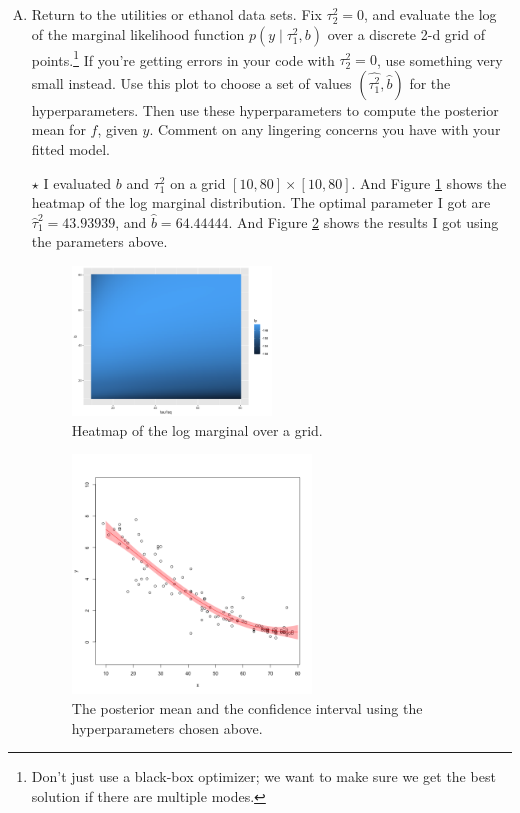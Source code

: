 \documentclass[11pt]{article}
\newcommand{\jie}{$\star$ }
\begin{document}
\begin{enumerate}[(A)]
\item Return to the utilities or ethanol data sets. Fix $\tau^2_2 = 0$, and evaluate the log of the marginal likelihood function $p(y \mid \tau^2_1, b)$ over a discrete 2-d grid of points.\footnote{Don't just use a black-box optimizer; we want to make sure we get the best solution if there are multiple modes.} If you're getting errors in your code with $\tau^2_2 = 0$, use something very small instead.  Use this plot to choose a set of values $(\hat{\tau^2_1}, \hat{b})$ for the hyperparameters.  Then use these hyperparameters to compute the posterior mean for $f$, given $y$.  Comment on any lingering concerns you have with your fitted model.

\bigskip \jie
I evaluated $b$ and $\tau_1^2$ on a grid $[10,80] \times [10,80]$. And Figure \ref{fig:heatmap} shows the heatmap of the log marginal distribution. The optimal parameter I got are $\hat{\tau}_1^2 = 43.93939$, and $\hat{b} = 64.44444$. And Figure \ref{fig:CI_GP_2} shows the results I got using the parameters above.

\begin{figure}[h]
    \centering
    \includegraphics[width=0.5\textwidth]{Ex6/figures/heatmap.png}
    \caption{Heatmap of the log marginal over a grid.}
    \label{fig:heatmap}
\end{figure}
\begin{figure}[h]
    \centering
    \includegraphics[width=0.6\textwidth]{Ex6/figures/CI_GP_2.png}
    \caption{The posterior mean and the confidence interval using the hyperparameters chosen above.}
    \label{fig:CI_GP_2}
\end{figure}


\end{enumerate}
\end{document}
